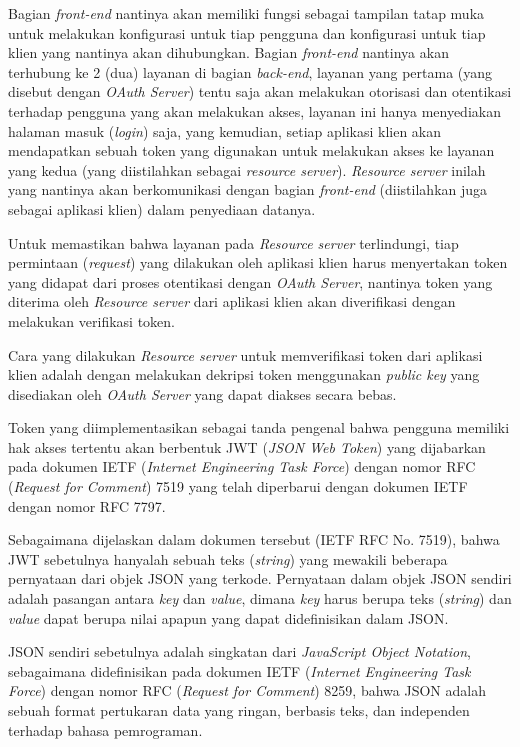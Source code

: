 \documentclass[pdftex,12pt, oneside]{article}
\begin{document}
Bagian \textit{front-end} nantinya akan memiliki fungsi sebagai tampilan tatap muka untuk melakukan konfigurasi untuk tiap pengguna dan konfigurasi untuk tiap klien yang nantinya akan dihubungkan. Bagian \textit{front-end} nantinya akan terhubung ke 2 (dua) layanan di bagian \textit{back-end}, layanan yang pertama (yang disebut dengan \textit{OAuth Server}) tentu saja akan melakukan otorisasi dan otentikasi terhadap pengguna yang akan melakukan akses, layanan ini hanya menyediakan halaman masuk (\textit{login}) saja, yang kemudian, setiap aplikasi klien akan mendapatkan sebuah token yang digunakan untuk melakukan akses ke layanan yang kedua (yang diistilahkan sebagai \textit{resource server}). \textit{Resource server} inilah yang nantinya akan berkomunikasi dengan bagian \textit{front-end} (diistilahkan juga sebagai aplikasi klien) dalam penyediaan datanya. 

Untuk memastikan bahwa layanan pada \textit{Resource server} terlindungi, tiap permintaan (\textit{request}) yang dilakukan oleh aplikasi klien harus menyertakan token yang didapat dari proses otentikasi dengan \textit{OAuth Server}, nantinya token yang diterima oleh \textit{Resource server} dari aplikasi klien akan diverifikasi dengan melakukan verifikasi token.

Cara yang dilakukan \textit{Resource server} untuk memverifikasi token dari aplikasi klien adalah dengan melakukan dekripsi token menggunakan \textit{public key} yang disediakan oleh \textit{OAuth Server} yang dapat diakses secara bebas.

Token yang diimplementasikan sebagai tanda pengenal bahwa pengguna memiliki hak akses tertentu akan berbentuk JWT (\textit{JSON Web Token}) yang dijabarkan pada dokumen IETF (\textit{Internet Engineering Task Force}) dengan nomor RFC (\textit{Request for Comment}) 7519 yang telah diperbarui dengan dokumen IETF dengan nomor RFC 7797.

Sebagaimana dijelaskan dalam dokumen tersebut (IETF RFC No. 7519), bahwa JWT sebetulnya hanyalah sebuah teks (\textit{string}) yang mewakili beberapa pernyataan dari objek JSON yang terkode. Pernyataan dalam objek JSON sendiri adalah pasangan antara \textit{key} dan \textit{value}, dimana \textit{key} harus berupa teks (\textit{string}) dan \textit{value} dapat berupa nilai apapun yang dapat didefinisikan dalam JSON.

JSON sendiri sebetulnya adalah singkatan dari \textit{JavaScript Object Notation}, sebagaimana didefinisikan pada dokumen IETF (\textit{Internet Engineering Task Force}) dengan nomor RFC (\textit{Request for Comment}) 8259, bahwa JSON adalah sebuah format pertukaran data yang ringan, berbasis teks, dan independen terhadap bahasa pemrograman.
\end{document}
